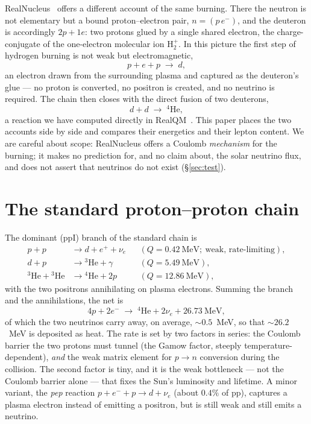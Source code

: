 \documentclass[11pt]{article}
\begin{document}
RealNucleus~\cite{Johnson-RealNucleus,Johnson-RealQM} offers a different account of the same burning.
There the neutron is not elementary but a bound proton--electron pair, $n=(p\,e^-)$, and the deuteron
is accordingly $2p+1e$: two protons glued by a single shared electron, the charge-conjugate of the
one-electron molecular ion $\mathrm{H}_2^{+}$. In this picture the first step of hydrogen burning is
not weak but electromagnetic,
\begin{equation}
p + e + p \;\longrightarrow\; d ,
\label{eq:pep}
\end{equation}
an electron drawn from the surrounding plasma and captured as the deuteron's glue --- no proton is
converted, no positron is created, and no neutrino is required. The chain then closes with the direct
fusion of two deuterons,
\begin{equation}
d + d \;\longrightarrow\; {}^4\mathrm{He} ,
\label{eq:dd}
\end{equation}
a reaction we have computed directly in RealQM~\cite{Johnson-RealNucleus}. This paper places the two
accounts side by side and compares their energetics and their lepton content. We are careful about
scope: RealNucleus offers a Coulomb \emph{mechanism} for the burning; it makes no prediction for, and
no claim about, the solar neutrino flux, and does not assert that neutrinos do not exist
(\S\ref{sec:test}).

\section{The standard proton--proton chain}

The dominant (ppI) branch of the standard chain is
\begin{align}
p + p &\to d + e^{+} + \nu_e && (Q = 0.42~\text{MeV};\ \text{weak, rate-limiting}),\\
d + p &\to {}^3\mathrm{He} + \gamma && (Q = 5.49~\text{MeV}),\\
{}^3\mathrm{He} + {}^3\mathrm{He} &\to {}^4\mathrm{He} + 2p && (Q = 12.86~\text{MeV}),
\end{align}
with the two positrons annihilating on plasma electrons. Summing the branch and the annihilations, the
net is
\begin{equation}
4p + 2e^- \;\longrightarrow\; {}^4\mathrm{He} + 2\nu_e + 26.73~\text{MeV},
\label{eq:standard-net}
\end{equation}
of which the two neutrinos carry away, on average, ${\sim}0.5$~MeV, so that ${\sim}26.2$~MeV is
deposited as heat. The rate is set by two factors in series: the Coulomb barrier the two protons must
tunnel (the Gamow factor, steeply temperature-dependent), \emph{and} the weak matrix element for
$p\to n$ conversion during the collision. The second factor is tiny, and it is the weak bottleneck ---
not the Coulomb barrier alone --- that fixes the Sun's luminosity and lifetime. A minor variant, the
\emph{pep} reaction $p+e^-+p\to d+\nu_e$ (about $0.4\%$ of pp), captures a plasma electron instead of
emitting a positron, but is still weak and still emits a neutrino.
\end{document}
